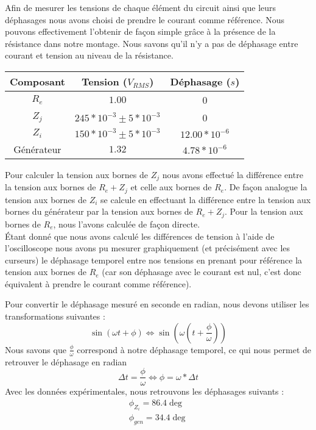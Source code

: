 \documentclass	[11pt, a4paper, openany]{book}
\begin{document}
Afin de mesurer les tensions de chaque élément du circuit ainsi que leurs déphasages nous avons choisi de prendre le courant comme référence. Nous pouvons effectivement l'obtenir de façon simple grâce à la présence de la résistance dans notre montage. Nous savons qu'il n'y a pas de déphasage entre courant et tension au niveau de la résistance.\\
\begin{center}
\begin{tabular}{|c|c|c|}
\hline 
\textbf{Composant} & \textbf{Tension} ($V_{RMS}$) & \textbf{Déphasage} ($s$) \\ 
\hline 
$R_e$ & $1.00$ & 0 \\ 
\hline 
$Z_j$ & $245*10^{-3} \pm 5*10^{-3}$ & 0 \\ 
\hline 
$Z_i$ & $150*10^{-3}\pm 5*10^{-3}$ & $12.00*10^{-6}$ \\ 
\hline 
Générateur & $1.32$ & $4.78*10^{-6}$ \\ 
\hline 
\end{tabular} 
\end{center}
Pour calculer la tension aux bornes de $Z_j$ nous avons effectué la différence entre la tension aux bornes de $R_e +Z_j$ et celle aux bornes de $R_e$. De façon analogue la tension aux bornes de $Z_i$ se calcule en effectuant la différence entre la tension aux bornes du générateur par la tension aux bornes de $R_e + Z_j$. Pour la tension aux bornes de $R_e$, nous l'avons calculée de façon directe.\\

Étant donné que nous avons calculé les différences de tension à l'aide de l'oscilloscope nous avons pu mesurer graphiquement (et précisément avec les curseurs) le déphasage temporel entre nos tensions en prenant pour référence la tension aux bornes de $R_e$ (car son déphasage avec le courant est nul, c'est donc équivalent à prendre le courant comme référence).
 

Pour convertir le déphasage mesuré en seconde en radian, nous devons utiliser les transformations suivantes :
\begin{equation}
\sin(\omega t + \phi) \Leftrightarrow \sin(\omega(t+\frac{\phi}{\omega}))
\end{equation}
Nous savons que $\frac{\phi}{\omega}$ correspond à notre déphasage temporel, ce qui nous permet de retrouver le déphasage en radian
\begin{equation}
\Delta t = \frac{\phi}{\omega} \Leftrightarrow \phi = \omega*\Delta t
\end{equation}
Avec les données expérimentales, nous retrouvons les déphasages suivants :
\begin{eqnarray}
\phi_{Z_i} = 86.4 \deg\\
\phi_{gen} = 34.4 \deg
\end{eqnarray}
\end{document}
